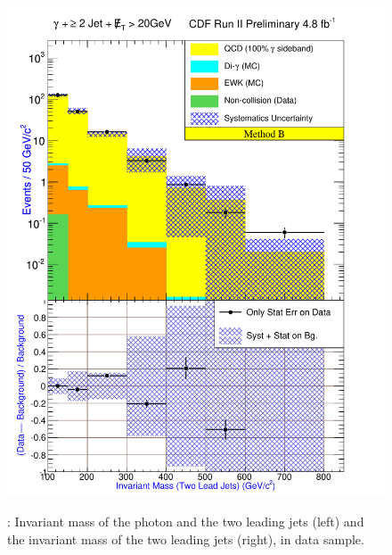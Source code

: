 \documentclass[11pt]{article}
\begin{document}
\begin{figure}[h!]
{ \includegraphics[scale=\resultsHistScale,keepaspectratio=true]{./g30jetmet20_MtdB_plot2_InvMass_j1j2.pdf}
}
\caption{: Invariant mass of the photon and the two leading jets (left) and the invariant mass of the two leading jets (right), in \photwojetmettwenty data sample.}
\label{fig:Result_MtdB_gj2Met20_Mass_gj1j2}
\end{figure}

\clearpage
\end{document}
